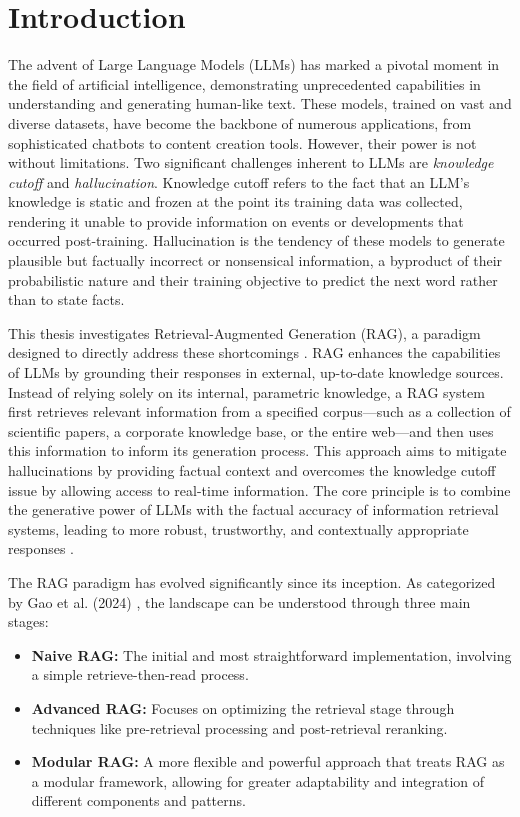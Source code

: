 \chapter{Introduction}
\label{chap:introduction}

The advent of Large Language Models (LLMs) has marked a pivotal moment in the field of artificial intelligence, demonstrating unprecedented capabilities in understanding and generating human-like text. These models, trained on vast and diverse datasets, have become the backbone of numerous applications, from sophisticated chatbots to content creation tools. However, their power is not without limitations. Two significant challenges inherent to LLMs are \textit{knowledge cutoff} and \textit{hallucination}. Knowledge cutoff refers to the fact that an LLM's knowledge is static and frozen at the point its training data was collected, rendering it unable to provide information on events or developments that occurred post-training. Hallucination is the tendency of these models to generate plausible but factually incorrect or nonsensical information, a byproduct of their probabilistic nature and their training objective to predict the next word rather than to state facts.

This thesis investigates Retrieval-Augmented Generation (RAG), a paradigm designed to directly address these shortcomings \autocite{lewis2020retrieval}. RAG enhances the capabilities of LLMs by grounding their responses in external, up-to-date knowledge sources. Instead of relying solely on its internal, parametric knowledge, a RAG system first retrieves relevant information from a specified corpus—such as a collection of scientific papers, a corporate knowledge base, or the entire web—and then uses this information to inform its generation process. This approach aims to mitigate hallucinations by providing factual context and overcomes the knowledge cutoff issue by allowing access to real-time information. The core principle is to combine the generative power of LLMs with the factual accuracy of information retrieval systems, leading to more robust, trustworthy, and contextually appropriate responses \autocite{gao2024retrievalaugmented}.

The RAG paradigm has evolved significantly since its inception. As categorized by Gao et al. (2024) \autocite{gao2024retrievalaugmented}, the landscape can be understood through three main stages:
\begin{itemize}
    \item \textbf{Naive RAG:} The initial and most straightforward implementation, involving a simple retrieve-then-read process.
    \item \textbf{Advanced RAG:} Focuses on optimizing the retrieval stage through techniques like pre-retrieval processing and post-retrieval reranking.
    \item \textbf{Modular RAG:} A more flexible and powerful approach that treats RAG as a modular framework, allowing for greater adaptability and integration of different components and patterns.
\end{itemize}

